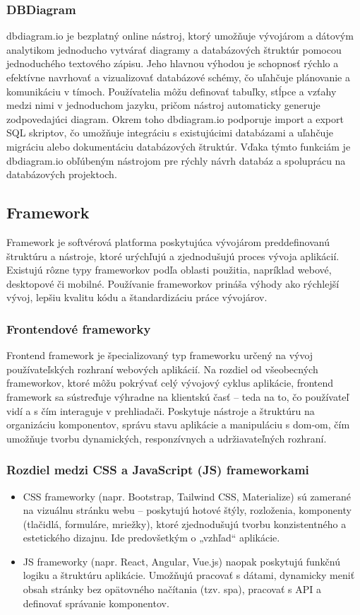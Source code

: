  \subsubsection{DBDiagram}
 dbdiagram.io je bezplatný online nástroj, ktorý umožňuje vývojárom a dátovým analytikom jednoducho vytvárať diagramy a databázových štruktúr pomocou jednoduchého textového zápisu.
 Jeho hlavnou výhodou je schopnosť rýchlo a efektívne navrhovať a vizualizovať databázové schémy, čo uľahčuje plánovanie a komunikáciu v tímoch.
 Používatelia môžu definovať tabuľky, stĺpce a vzťahy medzi nimi v jednoduchom jazyku, pričom nástroj automaticky generuje zodpovedajúci diagram.
 Okrem toho dbdiagram.io podporuje import a export SQL skriptov, čo umožňuje integráciu s existujúcimi databázami a uľahčuje migráciu alebo dokumentáciu databázových štruktúr.
 Vďaka týmto funkciám je dbdiagram.io obľúbeným nástrojom pre rýchly návrh databáz a spoluprácu na databázových projektoch.
 \subsection{Framework}
 Framework je softvérová platforma poskytujúca vývojárom preddefinovanú štruktúru a nástroje, ktoré urýchľujú a zjednodušujú proces vývoja aplikácií.
 Existujú rôzne typy frameworkov podľa oblasti použitia, napríklad webové, desktopové či mobilné.
 Používanie frameworkov prináša výhody ako rýchlejší vývoj, lepšiu kvalitu kódu a štandardizáciu práce vývojárov. \cite{framework}
 \subsubsection{Frontendové frameworky}
 Frontend framework je špecializovaný typ frameworku určený na vývoj používateľských rozhraní webových aplikácií.
 Na rozdiel od všeobecných frameworkov, ktoré môžu pokrývať celý vývojový cyklus aplikácie, frontend framework sa sústreďuje výhradne na klientskú časť – teda na to, čo používateľ vidí a s čím interaguje v prehliadači.
 Poskytuje nástroje a štruktúru na organizáciu komponentov, správu stavu aplikácie a manipuláciu s \acrshort{dom}-om, čím umožňuje tvorbu dynamických, responzívnych a udržiavateľných rozhraní.
 \subsubsection{Rozdiel medzi CSS a JavaScript (JS) frameworkami}
 \begin{itemize}
  \item CSS frameworky (napr. Bootstrap, Tailwind CSS, Materialize) sú zamerané na vizuálnu stránku webu – poskytujú hotové štýly, rozloženia, komponenty (tlačidlá, formuláre, mriežky), ktoré zjednodušujú tvorbu konzistentného a estetického dizajnu. Ide predovšetkým o „vzhľad“ aplikácie.
  \item JS frameworky (napr. React, Angular, Vue.js) naopak poskytujú funkčnú logiku a štruktúru aplikácie. 
  Umožňujú pracovať s dátami, dynamicky meniť obsah stránky bez opätovného načítania (tzv. \acrshort{spa}), pracovať s API a definovať správanie komponentov.\cite{feframework}
\end{itemize}
